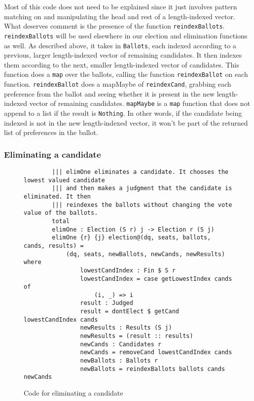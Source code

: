 Most of this code does not need to be explained since it just involves pattern
matching on and manipulating the head and rest of a length-indexed vector. What
deserves comment is the presence of the function \texttt{reindexBallots}.
\texttt{reindexBallots} will be used elsewhere in our election and elimination
functions as well. As described above, it takes in \texttt{Ballots}, each
indexed according to a previous, larger length-indexed vector of remaining
candidates. It then indexes them according to the next, smaller length-indexed
vector of candidates. This function does a \texttt{map} over the ballots,
calling the function \texttt{reindexBallot} on each function.
\texttt{reindexBallot} does a mapMaybe of \texttt{reindexCand}, grabbing each
preference from the ballot and seeing whether it is present in the new
length-indexed vector of remaining candidates. \texttt{mapMaybe} is a
\texttt{map} function that does not append to a list if the result is
\texttt{Nothing}. In other words, if the candidate being indexed is not in the
new length-indexed vector, it won't be part of the returned list of preferences
in the ballot. 

\subsubsection{Eliminating a candidate}

\begin{figure}[ht!!!!!!!!]
	\caption{Code for eliminating a candidate}
	\label{elim_cand_code}
    \begin{lstlisting}
        ||| elimOne eliminates a candidate. It chooses the lowest valued candidate
        ||| and then makes a judgment that the candidate is eliminated. It then
        ||| reindexes the ballots without changing the vote value of the ballots. 
        total
        elimOne : Election (S r) j -> Election r (S j)
        elimOne {r} {j} election@(dq, seats, ballots, cands, results) = 
            (dq, seats, newBallots, newCands, newResults) where
                lowestCandIndex : Fin $ S r
                lowestCandIndex = case getLowestIndex cands of
                    (i, _) => i
                result : Judged
                result = dontElect $ getCand lowestCandIndex cands
                newResults : Results (S j)
                newResults = (result :: results)
                newCands : Candidates r
                newCands = removeCand lowestCandIndex cands
                newBallots : Ballots r
                newBallots = reindexBallots ballots cands newCands
    \end{lstlisting}
\end{figure}

